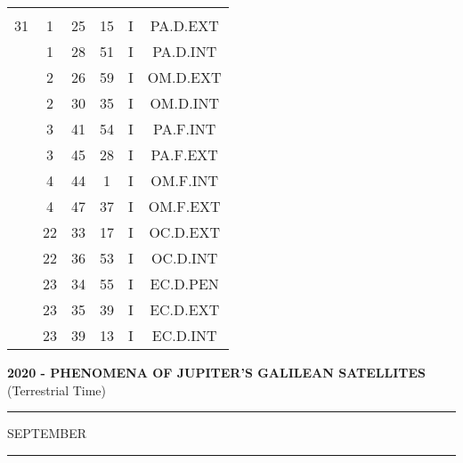 \documentclass[12pt, a4paper]{article}
\begin{document}
\begin{multicols}{3}
{\begin{tabular}{c c c c c c}
	 	 	 	 & & & & & \\%
	 	 	 	31 & 1 & 25 & 15 & I & PA.D.EXT\\%
	 	 	 	 & 1 & 28 & 51 & I & PA.D.INT\\%
	 	 	 	 & 2 & 26 & 59 & I & OM.D.EXT\\%
	 	 	 	 & 2 & 30 & 35 & I & OM.D.INT\\%
	 	 	 	 & 3 & 41 & 54 & I & PA.F.INT\\%
	 	 	 	 & 3 & 45 & 28 & I & PA.F.EXT\\%
	 	 	 	 & 4 & 44 & 1 & I & OM.F.INT\\%
	 	 	 	 & 4 & 47 & 37 & I & OM.F.EXT\\%
	 	 	 	 & 22 & 33 & 17 & I & OC.D.EXT\\%
	 	 	 	 & 22 & 36 & 53 & I & OC.D.INT\\%
	 	 	 	 & 23 & 34 & 55 & I & EC.D.PEN\\%
	 	 	 	 & 23 & 35 & 39 & I & EC.D.EXT\\%
	 	 	 	 & 23 & 39 & 13 & I & EC.D.INT\\%
	 	 \end{tabular}
 	}
\end{multicols}
\textbf{2020 - PHENOMENA OF JUPITER'S GALILEAN SATELLITES}\\(Terrestrial Time) 
\vspace{0.1cm} \hrule \vspace{0.1cm}
SEPTEMBER\vspace{0.1cm}
\hrule
\vspace{-0.2cm}
\end{document}
